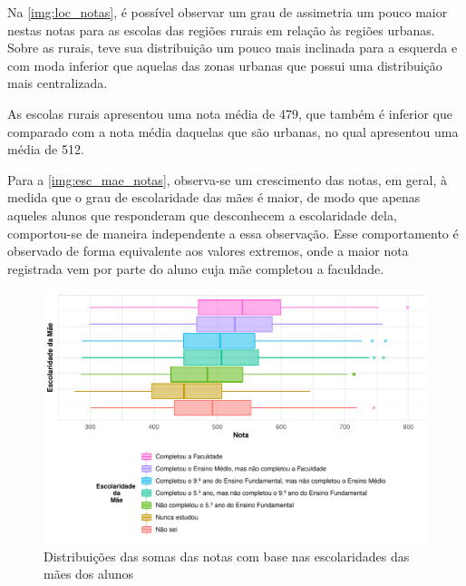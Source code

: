 Na \autoref{img:loc_notas}, é possível observar um grau de assimetria um pouco maior nestas notas para as escolas
das regiões rurais em relação às regiões urbanas. Sobre as rurais, teve sua distribuição um pouco mais inclinada
para a esquerda e com moda inferior que aquelas das zonas urbanas que possui uma distribuição mais centralizada.

As escolas rurais apresentou uma nota média de 479, que também é inferior que comparado com a nota média daquelas
que são urbanas, no qual apresentou uma média de 512.


Para a \autoref{img:esc_mae_notas}, observa-se um crescimento das notas, em geral, à medida que o grau de escolaridade
das mães é maior, de modo que apenas aqueles alunos que responderam que desconhecem a escolaridade dela,
comportou-se de maneira independente a essa observação. Esse comportamento é observado de forma equivalente aos valores extremos,
onde a maior nota registrada vem por parte do aluno cuja mãe completou a faculdade.
\newpage

\begin{figure}[h]
    \caption{Distribuições das somas das notas com base nas escolaridades 
    das mães dos alunos\label{img:esc_mae_notas}}
    \begin{center}
        \includegraphics[width=16cm]{img/esc_mae_notas.pdf}
    \end{center}
\end{figure}






